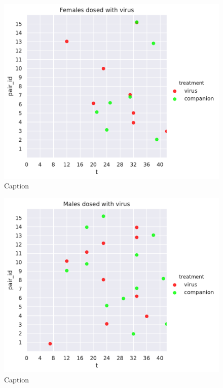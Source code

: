 \documentclass[11pt,letterpaper]{scrartcl}
\begin{document}
\begin{figure}[h]
\centering
\includegraphics[width=\textwidth]{tf.pdf}
\caption{Caption}
\label{fig:tf}
\end{figure}

\begin{figure}[h]
\centering
\includegraphics[width=\textwidth]{tm.pdf}
\caption{Caption}
\label{fig:tf}
\end{figure}
\end{document}
